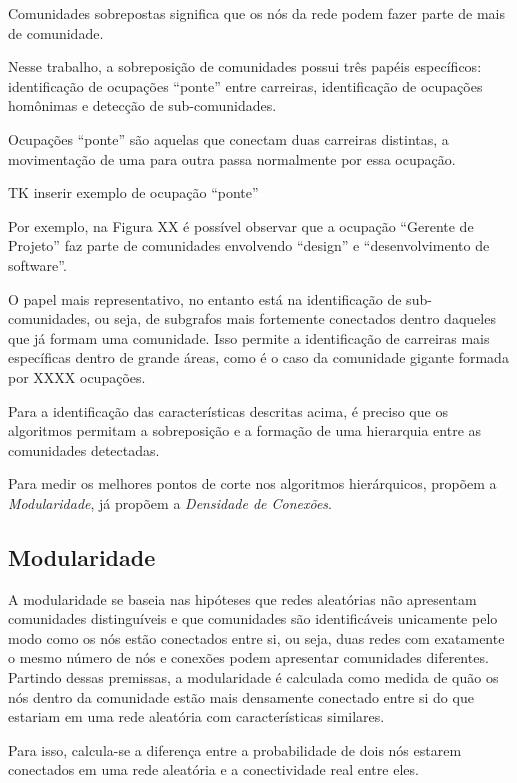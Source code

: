\documentclass[
  article,
  11pt,
  a4paper,
  english,
  brazil,
  sumario=tradicional]{abntex2}
\begin{document}
Comunidades sobrepostas significa que os nós da rede podem fazer parte de mais de comunidade.

Nesse trabalho, a sobreposição de comunidades possui três papéis específicos: identificação de ocupações \enquote{ponte} entre carreiras, identificação de ocupações homônimas e detecção de sub-comunidades.

Ocupações \enquote{ponte} são aquelas que conectam duas carreiras distintas, a movimentação de uma para outra passa normalmente por essa ocupação.

TK inserir exemplo de ocupação \enquote{ponte}

Por exemplo, na Figura XX é possível observar que a ocupação \enquote{Gerente de Projeto} faz parte de comunidades envolvendo \enquote{design} e \enquote{desenvolvimento de software}.

O papel mais representativo, no entanto está na identificação de sub-comunidades, ou seja, de subgrafos mais fortemente conectados dentro daqueles que já formam uma comunidade. Isso permite a identificação de carreiras mais específicas dentro de grande áreas, como é o caso da comunidade gigante formada por XXXX ocupações.

Para a identificação das características descritas acima, é preciso que os algoritmos permitam a sobreposição e a formação de uma hierarquia entre as comunidades detectadas.

Para medir os melhores pontos de corte nos algoritmos hierárquicos,  propõem a \textit{Modularidade}, já  propõem a \textit{Densidade de Conexões}.

\subsection{Modularidade}

A modularidade se baseia nas hipóteses que redes aleatórias não apresentam comunidades distinguíveis e que comunidades são identificáveis unicamente pelo modo como os nós estão conectados entre si, ou seja, duas redes com exatamente o mesmo número de nós e conexões podem apresentar comunidades diferentes. Partindo dessas premissas, a modularidade é calculada como medida de quão os nós dentro da comunidade estão mais densamente conectado entre si do que estariam em uma rede aleatória com características similares.

Para isso, calcula-se a diferença entre a probabilidade de dois nós estarem conectados em uma rede aleatória e a conectividade real entre eles.
\end{document}

